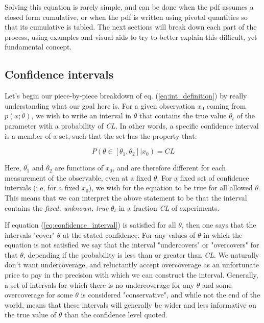 Solving this equation is rarely simple, and can be done when the pdf assumes a closed form cumulative, or when the pdf is written using pivotal quantities so that its cumulative is tabled. The next sections will break down each part of the process, using examples and visual aids to try to better explain this difficult, yet fundamental concept.

\subsection{Confidence intervals}
Let's begin our piece-by-piece breakdown of eq. (\ref{eq:int_definition}) by really understanding what our goal here is. For a given observation $x_0$ coming from $p(x;\theta)$, we wish to write an interval in $\theta$ that contains the true value $\theta_t$ of the parameter with a probability of \emph{CL}. In other words, a specific confidence interval is a member of a set, such that the set has the property that\cite{Feldman_1998}:

\begin{equation}
	P\left(\theta\in\left[\theta_1,\theta_2\right]|x_0\right) = CL
\label{eq:confidence_interval}
\end{equation}

Here, $\theta_1$ and $\theta_2$ are functions of $x_0$, and are therefore different for each measurement of the observable, even at a fixed $\theta$. For a fixed set of confidence intervals (i.e, for a fixed $x_0$), we wish for the equation to be true for all allowed $\theta$. This means that we can interpret the above statement to be that the interval contains the \emph{fixed, unknown, true} $\theta_t$ in a fraction \emph{CL} of experiments.

If equation (\ref{eq:confidence_interval}) is satisfied for all $\theta$, then one says that the intervals "cover" $\theta$ at the stated confidence. For any values of $\theta$ in which the equation is not satisfied we say that the interval "undercovers" or "overcovers" for that $\theta$, depending if the probability is less than or greater than \emph{CL}. We naturally don't want undercoverage, and reluctantly accept overcoverage as an unfortunate price to pay in the precision with which we can construct the interval. Generally, a set of intervals for which there is no undercoverage for any $\theta$ and some overcoverage for some $\theta$ is considered "conservative", and while not the end of the world, means that these intervals will generally be wider and less informative on the true value of $\theta$ than the confidence level quoted.

